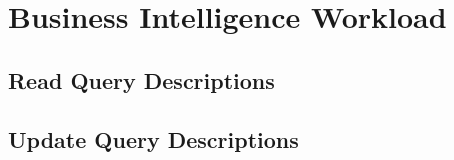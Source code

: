 \chapter{Business Intelligence Workload}
\label{section:bi}


\section{Read Query Descriptions}



























\renewcommand{\currentQueryCard}{0}


\section{Update Query Descriptions}

